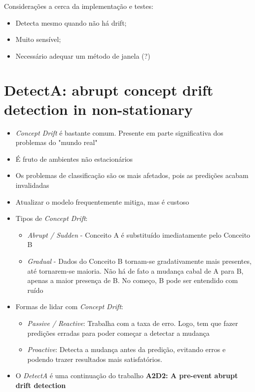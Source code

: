 \documentclass[qual, classic, a4paper]{ufbathesis}
\begin{document}
Considerações a cerca da implementação e testes:

\begin{itemize}
    \item Detecta mesmo quando não há drift;
    \item Muito sensível;
    \item Necessário adequar um método de janela (?)
\end{itemize}


\section{DetectA: abrupt concept drift detection in non-stationary \cite{ESCOVEDO2018119}}

\begin{itemize}
    \item \textit{Concept Drift} é bastante comum. Presente em parte significativa dos problemas do "mundo real"
    \item É fruto de ambientes não estacionários
    \item Os problemas de classificação são os mais afetados, pois as predições acabam invalidadas
    \item Atualizar o modelo frequentemente mitiga, mas é custoso
    \item Tipos de \textit{Concept Drift}:
    \begin{itemize}
        \item \textit{Abrupt / Sudden} - Conceito A é substituído imediatamente pelo Conceito B
        \item \textit{Gradual} - Dados do Conceito B tornam-se gradativamente mais presentes, até tornarem-se maioria.
        Não há de fato a mudança cabal de A para B, apenas a maior presença de B. 
        No começo, B pode ser entendido com ruído
    \end{itemize}
    \item Formas de lidar com \textit{Concept Drift}:
    \begin{itemize}
        \item \textit{Passive / Reactive}: Trabalha com a taxa de erro. Logo, tem que fazer predições erradas para poder começar a detectar a mudança
        \item \textit{Proactive}: Detecta a mudança antes da predição, evitando erros e podendo trazer resultados mais satisfatórios.
    \end{itemize}
    \item O \textit{DetectA} é uma continuação do trabalho \textbf{A2D2: A pre-event abrupt drift detection} \cite{Escovedo2015A2D2AP}

\end{itemize}
\end{document}
